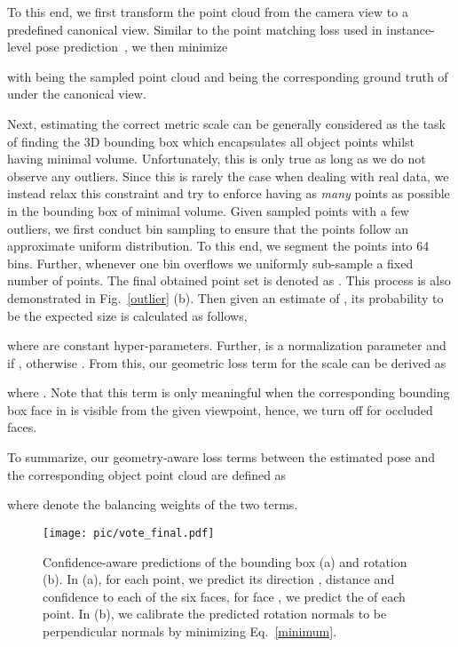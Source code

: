 \documentclass[10pt,twocolumn,letterpaper]{article}
\begin{document}
To this end, we first transform the point cloud from the camera view to a predefined canonical view. Similar to the point matching loss used in instance-level pose prediction~\cite{GDRN, sopose, li2019deepim}, we then minimize

with  being the sampled point cloud and  being the corresponding ground truth of  under the canonical view.

Next, estimating the correct metric scale can be generally considered as the task of finding the 3D bounding box which encapsulates all object points whilst having minimal volume. 
Unfortunately, this is only true as long as we do not observe any outliers. 
Since this is rarely the case when dealing with real data, we instead relax this constraint and try to enforce having as \textit{many} points as possible in the bounding box of minimal volume. 
Given sampled points with a few outliers, we first conduct bin sampling to ensure that the points follow an approximate uniform distribution.
To this end, we segment the points into 64 bins. Further, whenever one bin overflows we uniformly sub-sample a fixed number of points. The final obtained point set is denoted as . This process is also demonstrated in Fig.~\ref{outlier} (b).
Then given an estimate of , its probability to be the expected size is calculated as follows,




where  are constant hyper-parameters.
Further,  is a normalization parameter and  if , otherwise .
From this, our geometric loss term for the scale  can be derived as

where .
Note that this term is only meaningful when the corresponding bounding box face in  is visible from the given viewpoint, hence, we turn off  for occluded faces.

To summarize, our geometry-aware loss terms between the estimated pose and the corresponding object point cloud are defined as

where  denote the balancing weights of the two terms.

\begin{figure}[t]
  \centering
  \texttt{[image: pic/vote\_final.pdf]}
  \caption{Confidence-aware predictions of the bounding box (a) and rotation (b).
  In (a), for each point, we predict its direction , distance  and confidence  to each of the six faces, \eg for face , we predict the  of each point.
  In (b), we calibrate the predicted rotation normals  to be perpendicular normals  by minimizing  Eq.~\ref{minimum}.
   }
  \label{voteandR}
\end{figure}
\end{document}
